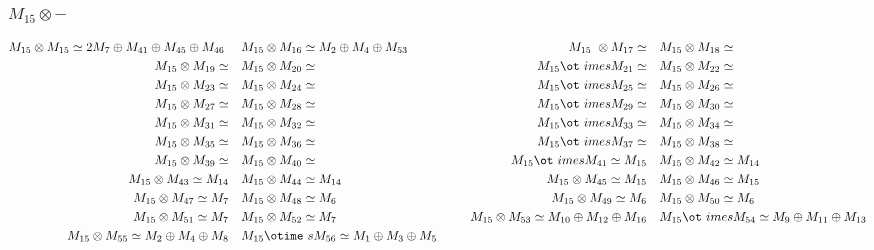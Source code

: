 \subsubsection{$M_15\otimes -$}
\begin{align*}
M_{15} \otimes M_{15} \simeq 2 M_{7} \oplus M_{41} \oplus M_{45} \oplus M_{46}\
 &&& M_{15} \otimes M_{16} \simeq M_{2} \oplus M_{4} \oplus M_{53} &&& M_{15} \
\otimes M_{17} \simeq  &&& M_{15} \otimes M_{18} \simeq \\
M_{15} \otimes M_{19} \simeq  &&& M_{15} \otimes M_{20} \simeq  &&& M_{15} \ot\
imes M_{21} \simeq  &&& M_{15} \otimes M_{22} \simeq \\
M_{15} \otimes M_{23} \simeq  &&& M_{15} \otimes M_{24} \simeq  &&& M_{15} \ot\
imes M_{25} \simeq  &&& M_{15} \otimes M_{26} \simeq \\
M_{15} \otimes M_{27} \simeq  &&& M_{15} \otimes M_{28} \simeq  &&& M_{15} \ot\
imes M_{29} \simeq  &&& M_{15} \otimes M_{30} \simeq \\
M_{15} \otimes M_{31} \simeq  &&& M_{15} \otimes M_{32} \simeq  &&& M_{15} \ot\
imes M_{33} \simeq  &&& M_{15} \otimes M_{34} \simeq \\
M_{15} \otimes M_{35} \simeq  &&& M_{15} \otimes M_{36} \simeq  &&& M_{15} \ot\
imes M_{37} \simeq  &&& M_{15} \otimes M_{38} \simeq \\
M_{15} \otimes M_{39} \simeq  &&& M_{15} \otimes M_{40} \simeq  &&& M_{15} \ot\
imes M_{41} \simeq M_{15} &&& M_{15} \otimes M_{42} \simeq M_{14}\\
M_{15} \otimes M_{43} \simeq M_{14} &&& M_{15} \otimes M_{44} \simeq M_{14} &&\
& M_{15} \otimes M_{45} \simeq M_{15} &&& M_{15} \otimes M_{46} \simeq M_{15}\
\\
M_{15} \otimes M_{47} \simeq M_{7} &&& M_{15} \otimes M_{48} \simeq M_{6} &&& \
M_{15} \otimes M_{49} \simeq M_{6} &&& M_{15} \otimes M_{50} \simeq M_{6}\\
M_{15} \otimes M_{51} \simeq M_{7} &&& M_{15} \otimes M_{52} \simeq M_{7} &&& \
M_{15} \otimes M_{53} \simeq M_{10} \oplus M_{12} \oplus M_{16} &&& M_{15} \ot\
imes M_{54} \simeq M_{9} \oplus M_{11} \oplus M_{13}\\
M_{15} \otimes M_{55} \simeq M_{2} \oplus M_{4} \oplus M_{8} &&& M_{15} \otime\
s M_{56} \simeq M_{1} \oplus M_{3} \oplus M_{5}\\
\end{align*}

